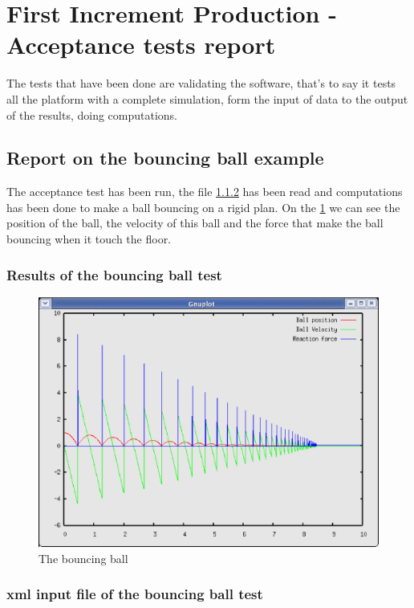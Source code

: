 \section{First Increment Production - Acceptance tests report}
The tests that have been done are validating the software, that's to say it tests all the platform with a complete simulation, form the
input of data to the output of the results, doing computations.

\subsection{Report on the bouncing ball example}
The acceptance test has been run, the file \ref{BouncingBall_TIDS.xml} has been read and computations has been done to make a ball
bouncing on a rigid plan. On the \ref{acceptanceTest} we can see the position of the ball, the velocity of this ball
and the force that make the ball bouncing when it touch the floor.

\subsubsection{Results of the bouncing ball test}
\begin{figure}[!hbp]
\begin{center}
\includegraphics[scale=0.80]{figure/acceptanceTest.ps}
\caption{The bouncing ball}
\label{acceptanceTest}
\end{center}
\end{figure}

\subsubsection{\ac{xml} input file of the bouncing ball test}
\label{BouncingBall_TIDS.xml}

